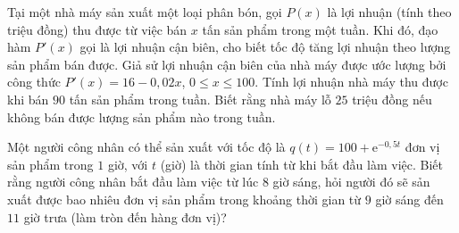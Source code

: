 \begin{bt}%
	Tại một nhà máy sản xuất một loại phân bón, gọi $P(x)$ là lợi nhuận (tính theo triệu đồng) thu được từ việc bán $x$ tấn sản phẩm trong một tuần. Khi đó, đạo hàm $P'(x)$ gọi là lợi  nhuận cận biên, cho biết tốc độ tăng lợi nhuận theo lượng sản phẩm bán được. Giả sử lợi nhuận cận biên của nhà máy được ước lượng bởi công thức $P'(x) = 16 - 0{,}02x$, $0 \le x \le 100$. Tính lợi nhuận nhà máy thu được khi bán $90$ tấn sản phẩm trong tuần. Biết rằng nhà máy lỗ $25$ triệu đồng nếu không bán được lượng sản phẩm nào trong tuần.
\end{bt}

\begin{bt}%
	Một người công nhân có  thể sản xuất với tốc độ là $q(t) = 100 + \mathrm{e}^{-0{,}5t}$ đơn vị sản phẩm trong $1$ giờ, với $t$ (giờ) là thời gian tính từ khi bắt đầu làm việc. Biết rằng người công nhân bắt đầu làm việc từ lúc 8 giờ sáng, hỏi người đó sẽ sản xuất được bao nhiêu đơn vị sản phẩm trong khoảng thời gian từ $9$ giờ sáng đến $11$ giờ trưa (làm tròn đến hàng đơn vị)?
\end{bt}

